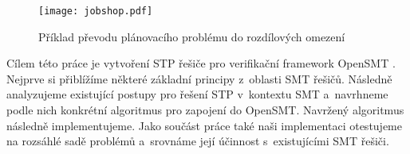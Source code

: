 \begin{figure}[b]
	\centering
	\texttt{[image: jobshop.pdf]}
	\caption{Příklad převodu plánovacího problému do rozdílových omezení} 
	\label{fig:job}
\end{figure}

Cílem této práce je vytvoření STP řešiče pro verifikační framework OpenSMT \cite{OpenSMT}. Nejprve si přiblížíme některé základní principy z~oblasti SMT řešičů. Následně analyzujeme existující postupy pro řešení STP v~kontextu SMT a~navrhneme podle nich konkrétní algoritmus pro zapojení do OpenSMT. Navržený algoritmus následně implementujeme. Jako součást práce také naši implementaci otestujeme na rozsáhlé sadě problémů a~srovnáme její účinnost s~existujícími SMT řešiči.

